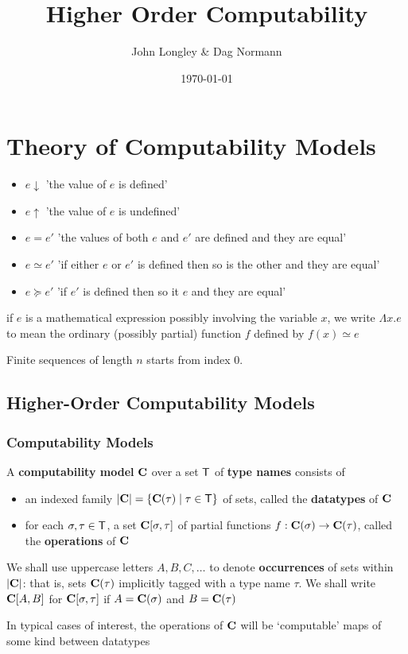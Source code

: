 \documentclass[11pt]{article}
\author{John Longley \& Dag Normann}
\date{\today}
\title{Higher Order Computability}
\begin{document}
\maketitle
\tableofcontents


\section{Theory of Computability Models}
\label{sec:org8b4882b}
\begin{itemize}
\item \(e\downarrow\) 'the value of \(e\) is defined'
\item \(e\uparrow\) 'the value of \(e\) is undefined'
\item \(e=e'\) 'the values of both \(e\) and \(e'\) are defined and they are equal'
\item \(e\simeq e'\) 'if either \(e\) or \(e'\) is defined then so is the other and they are equal'
\item \(e\succeq e'\) 'if \(e'\) is defined then so it \(e\) and they are equal'
\end{itemize}


if \(e\) is a mathematical expression possibly involving the variable \(x\), we write \(\Lambda x.e\)
to mean the ordinary (possibly partial) function \(f\) defined by \(f(x)\simeq e\)

Finite sequences of length \(n\) starts from index 0.
\subsection{Higher-Order Computability Models}
\label{sec:org1f2d573}
\subsubsection{Computability Models}
\label{sec:org5c780b8}
\begin{definition}[]
A \textbf{computability model} \(\operatorname{\textbf{C}}\)  over a set \(\textsf{T}\) of \textbf{type names} consists of
\begin{itemize}
\item an indexed family \(\abs{\bC}=\{\bC(\tau)\mid\tau\in\sfT\}\) of sets, called the \textbf{datatypes} of \(\operatorname{\textbf{C}}\)
\item for each \(\sigma,\tau\in\textsf{T}\), a set \(\operatorname{\textbf{C}}[\sigma,\tau]\) of partial functions \(f:\operatorname{\textbf{C}}(\sigma)\to\operatorname{\textbf{C}}(\tau)\), called the
\textbf{operations} of \(\operatorname{\textbf{C}}\)
\end{itemize}
\end{definition}

We shall use uppercase letters \(A,B,C,\dots\) to denote \textbf{occurrences} of sets within \(\abs{\bC}\):
that is, sets \(\operatorname{\textbf{C}}(\tau)\) implicitly tagged with a type name \(\tau\). We shall write \(\operatorname{\textbf{C}}[A,B]\)
for \(\operatorname{\textbf{C}}[\sigma,\tau]\) if \(A=\operatorname{\textbf{C}}(\sigma)\) and \(B=\operatorname{\textbf{C}}(\tau)\)

In typical cases of interest, the operations of \(\operatorname{\textbf{C}}\) will be ‘computable’ maps of some kind between datatypes
\end{document}
